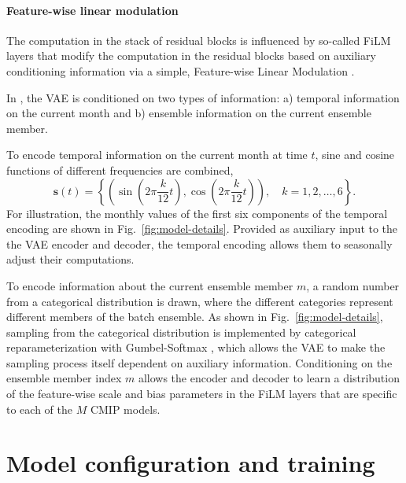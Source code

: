 \documentclass[english,a4paper,10pt]{scrartcl}
\begin{document}
\paragraph{Feature-wise linear modulation}
The computation in the stack of residual blocks is influenced by so-called FiLM layers that modify the computation in the residual blocks based on auxiliary conditioning information via a simple, Feature-wise Linear Modulation \citep[FiLM,][]{Perez.Strub.ea.2018}.

In \cite{Groth.Chavez.2023}, the VAE is conditioned on two types of information: a) temporal information on the current month and b) ensemble information on the current ensemble member.

To encode temporal information on the current month at time $t$, sine and cosine functions of different frequencies are combined,
\begin{equation}
    \mathbf{s}(t)=\left\{ \left(\sin(2\pi\frac{k}{12}t),\cos(2\pi\frac{k}{12}t)\right),\quad k=1,2,\dots,6\right\}.\label{eq:temporal-encoding}
\end{equation}
For illustration, the monthly values of the first six components of the temporal encoding are shown in Fig.~\ref{fig:model-details}. Provided as auxiliary input to the the VAE encoder and decoder, the temporal encoding allows them to seasonally adjust their computations.

To encode information about the current ensemble member $m$, a random number from a categorical distribution is drawn, where the different categories represent different members of the batch ensemble. As shown in Fig.~\ref{fig:model-details}, sampling from the categorical distribution is implemented by categorical reparameterization with Gumbel-Softmax \citep{Jang.Gu.ea.2017.Gumbel-softmax}, which allows the VAE to make the sampling process itself dependent on auxiliary information. Conditioning on the ensemble member index $m$ allows the encoder and decoder to learn a distribution of the feature-wise scale and bias parameters in the FiLM layers that are specific to each of the $M$ CMIP models.

\section{Model configuration and training}\label{app:model-params-training}
\end{document}
